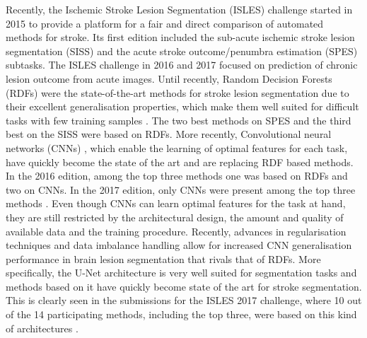 \documentclass[letterpaper,final,authoryear,3p,times,twocolumn]{elsarticle}
\begin{document}
Recently, the Ischemic Stroke Lesion Segmentation (ISLES) challenge \citep{Maier2017isles}  started in 2015 to provide a platform for a fair and direct comparison of automated methods for stroke. Its first edition included the sub-acute ischemic stroke lesion segmentation (SISS) and the acute stroke outcome/penumbra estimation (SPES) subtasks. The ISLES challenge in 2016 and 2017 focused on prediction of chronic lesion outcome from acute images. Until recently, Random Decision Forests (RDFs) \citep{TinKamHo1995} were the state-of-the-art methods for stroke lesion segmentation due to their excellent generalisation properties, which make them well suited for difficult tasks with few training samples \citep{Maier2015}. The two best methods on SPES \citep{maieo, mckir} and the third best on the SISS \citep{Halme2015} were based on RDFs. More recently, Convolutional neural networks (CNNs) \citep{Lecun2015}, which enable the learning of optimal features for each task, have quickly become the state of the art and are replacing RDF based methods. In the 2016 edition, among the top three methods one was based on RDFs and two on CNNs. In the 2017 edition, only CNNs were present among the top three methods \citep{Winzeck2018}. Even though CNNs can learn optimal features for the task at hand, they are still restricted by the architectural design, the amount and quality of available data and the training procedure. Recently, advances in regularisation techniques and data imbalance handling allow for increased CNN generalisation performance in brain lesion segmentation that rivals that of RDFs. More specifically, the U-Net architecture \citep{Ronneberger2015} is very well suited for segmentation tasks and methods based on it have quickly become state of the art for stroke segmentation. This is clearly seen in the submissions for the ISLES 2017 challenge, where 10 out of the 14 participating methods, including the top three, were based on this kind of architectures \citep{Winzeck2018}.
\end{document}
